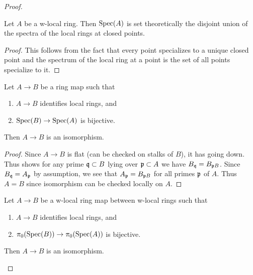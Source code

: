 \begin{proof}
\begin{lemma}
  \label{thm:w-local-set-decomposition}
  Let $A$ be a w-local ring. Then $\operatorname{Spec} (A)$ is set theoretically the disjoint union of the spectra of the local
  rings at closed points.
\end{lemma}

\begin{proof}
  This follows from the fact that every point specializes to a unique closed point and the spectrum of the local ring at a point is the set of all points specialize to it.
\end{proof}

\begin{lemma}
  \label{thm:isom-of-identifies-local-rings-bijective}
  Let $A \to B$ be a ring map such that
  \begin{enumerate}
    \item $A \to B$ identifies local rings, and
    \item $\operatorname{Spec} (B) \to \operatorname{Spec} (A)$ is bijective.
  \end{enumerate}
  Then $A \to B$ is an isomorphism.
\end{lemma}

\begin{proof}
    Since $A \to B$ is flat (can be checked on stalks of \(B\)), it has going down. %
    Thus  shows for any prime ${\mathfrak{q}} \subset B$ lying over ${\mathfrak{p}} \subset A$ we have $B_{{\mathfrak{q}}} = B_{{\mathfrak{p}} B}$. Since $B_{{\mathfrak{q}}} = A_{{\mathfrak{p}}}$ by assumption, we see that $A_{{\mathfrak{p}}} = B_{{\mathfrak{p}} B}$ for all primes ${\mathfrak{p}}$ of $A$. Thus $A = B$ since isomorphism can be checked locally on $A$.
\end{proof}

\begin{lemma}[\stacksproject{097E}]
  \label{thm:isom-of-identifies-local-rings-w-local-isom-pi0}
  Let $A \to B$ be a w-local ring map between w-local rings such that
  \begin{enumerate}
    \item $A \to B$ identifies local rings, and
    \item $\pi_0(\operatorname{Spec} (B)) \to \pi_0(\operatorname{Spec} (A))$ is bijective.
  \end{enumerate}
  Then $A \to B$ is an isomorphism.
\end{lemma}


\end{proof}
